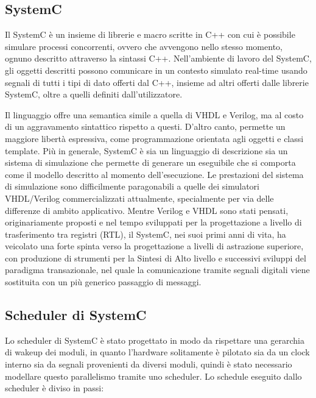 \documentclass[a4paper,titlepage]{book}
\begin{document}
\subsection{SystemC}
Il SystemC è un insieme di librerie e macro scritte in C++ con cui è possibile simulare processi concorrenti, ovvero che avvengono nello stesso momento, ognuno descritto attraverso la sintassi C++. Nell'ambiente di lavoro del SystemC, gli oggetti descritti possono comunicare in un contesto simulato real-time usando segnali di tutti i tipi di dato offerti dal C++, insieme ad altri offerti dalle librerie SystemC, oltre a quelli definiti dall'utilizzatore.

Il linguaggio offre una semantica simile a quella di VHDL e Verilog, ma al costo di un aggravamento sintattico rispetto a questi. D'altro canto, permette un maggiore libertà espressiva, come programmazione orientata agli oggetti e classi template. Più in generale, SystemC è sia un linguaggio di descrizione sia un sistema di simulazione che permette di generare un eseguibile che si comporta come il modello descritto al momento dell'esecuzione. Le prestazioni del sistema di simulazione sono difficilmente paragonabili a quelle dei simulatori VHDL/Verilog commercializzati attualmente, specialmente per via delle differenze di ambito applicativo. Mentre Verilog e VHDL sono stati pensati, originariamente proposti e nel tempo sviluppati per la progettazione a livello di trasferimento tra registri (RTL), il SystemC, nei suoi primi anni di vita, ha veicolato una forte spinta verso la progettazione a livelli di astrazione superiore, con produzione di strumenti per la Sintesi di Alto livello e successivi sviluppi del paradigma transazionale, nel quale la comunicazione tramite segnali digitali viene sostituita con un più generico passaggio di messaggi.

\subsection{Scheduler di SystemC}

Lo scheduler di SystemC è stato progettato in modo da rispettare una gerarchia di wakeup dei moduli, in quanto l'hardware solitamente è pilotato sia da un clock interno sia da segnali provenienti da diversi moduli, quindi è stato necessario modellare questo parallelismo tramite uno scheduler. Lo schedule eseguito dallo scheduler è diviso in passi:
\end{document}
